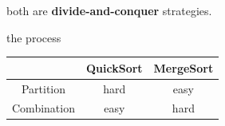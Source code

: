 \documentclass[UTF8,11pt,handout]{beamer}
\begin{document}
\begin{frame}[t]
\begin{center}
	\end{center}
	\begin{block}{}
		\begin{description}
			\pause\item[Similarity:] both are {\color{red}\textbf{divide-and-conquer}} strategies.
			\pause\item[Difference:]  the process
			\begin{center}
				\begin{table}[]
					\centering
					\begin{tabular}{c|cc}
						\textbf{} & \textbf{QuickSort} & \textbf{MergeSort} \\\hline
						Partition    & hard               & {\color{blue}easy}               \\
						Combination   & {\color{blue}easy}                 & hard              
					\end{tabular}
				\end{table}
			\end{center}
		\end{description}
	\end{block}
\end{frame}
\end{document}
